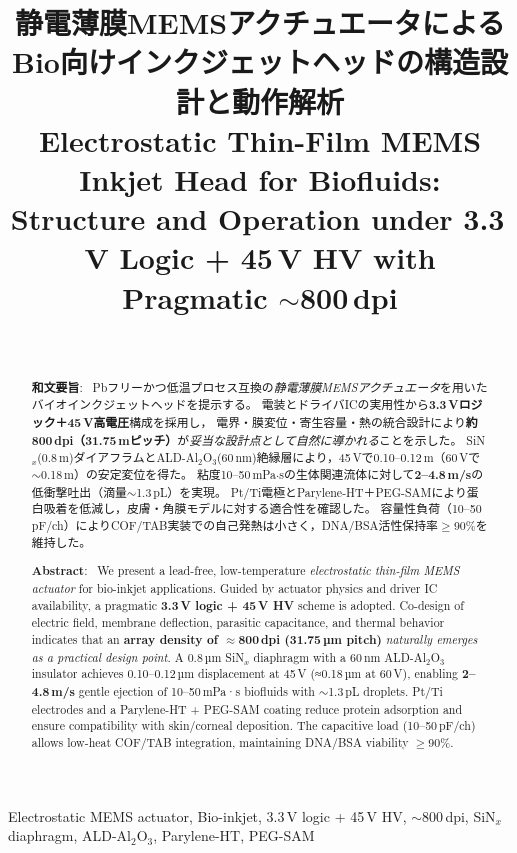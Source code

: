 \documentclass[conference]{IEEEtran}
\title{静電薄膜MEMSアクチュエータによるBio向けインクジェットヘッドの構造設計と動作解析\\
\large Electrostatic Thin-Film MEMS Inkjet Head for Biofluids: Structure and Operation under 3.3\,V Logic + 45\,V HV with Pragmatic \texorpdfstring{$\sim$}{\textasciitilde}800\,dpi}
\author{\IEEEauthorblockN{三溝 真一（Shinichi Samizo)}\\
\IEEEauthorblockA{独立系半導体研究者（元セイコーエプソン）\\
Email: \href{mailto:shin3t72@gmail.com}{shin3t72@gmail.com}\quad
GitHub: \url{https://github.com/Samizo-AITL}}}
\begin{document}
\maketitle

\begin{abstract}
\textbf{和文要旨}:~
Pbフリーかつ低温プロセス互換の\emph{静電薄膜MEMSアクチュエータ}を用いたバイオインクジェットヘッドを提示する。
電装とドライバICの実用性から\textbf{3.3\,Vロジック＋45\,V高電圧}構成を採用し，
電界・膜変位・寄生容量・熱の統合設計により\textbf{約800\,dpi（31.75\,\textmu mピッチ）}が\emph{妥当な設計点として自然に導かれる}ことを示した。
SiN$_x$(0.8\,\textmu m)ダイアフラムとALD-Al$_2$O$_3$(60\,nm)絶縁層により，45\,Vで0.10--0.12\,\textmu m（60\,Vで$\sim$0.18\,\textmu m）の安定変位を得た。
粘度10--50\,mPa$\cdot$sの生体関連流体に対して\textbf{2--4.8\,m/s}の低衝撃吐出（滴量$\sim$1.3\,pL）を実現。
Pt/Ti電極とParylene-HT＋PEG-SAMにより蛋白吸着を低減し，皮膚・角膜モデルに対する適合性を確認した。
容量性負荷（10--50\,pF/ch）によりCOF/TAB実装での自己発熱は小さく，DNA/BSA活性保持率$\ge$90\%を維持した。
\medskip

\noindent\textbf{Abstract}:~
We present a lead-free, low-temperature \emph{electrostatic thin-film MEMS actuator} for bio-inkjet applications.
Guided by actuator physics and driver IC availability, a pragmatic \textbf{3.3\,V logic + 45\,V HV} scheme is adopted.
Co-design of electric field, membrane deflection, parasitic capacitance, and thermal behavior indicates that an \textbf{array density of $\approx$800\,dpi (31.75\,µm pitch)} \emph{naturally emerges as a practical design point}.
A 0.8\,µm SiN$_x$ diaphragm with a 60\,nm ALD-Al$_2$O$_3$ insulator achieves 0.10–0.12\,µm displacement at 45\,V (≈0.18\,µm at 60\,V), enabling \textbf{2–4.8\,m/s} gentle ejection of 10–50\,mPa·s biofluids with $\sim$1.3\,pL droplets.
Pt/Ti electrodes and a Parylene-HT + PEG-SAM coating reduce protein adsorption and ensure compatibility with skin/corneal deposition.
The capacitive load (10–50\,pF/ch) allows low-heat COF/TAB integration, maintaining DNA/BSA viability $\ge$90\%.
\end{abstract}

\begin{IEEEkeywords}
Electrostatic MEMS actuator, Bio-inkjet, 3.3\,V logic + 45\,V HV, $\sim$800\,dpi, SiN$_x$ diaphragm, ALD-Al$_2$O$_3$, Parylene-HT, PEG-SAM
\end{IEEEkeywords}

\end{document}
